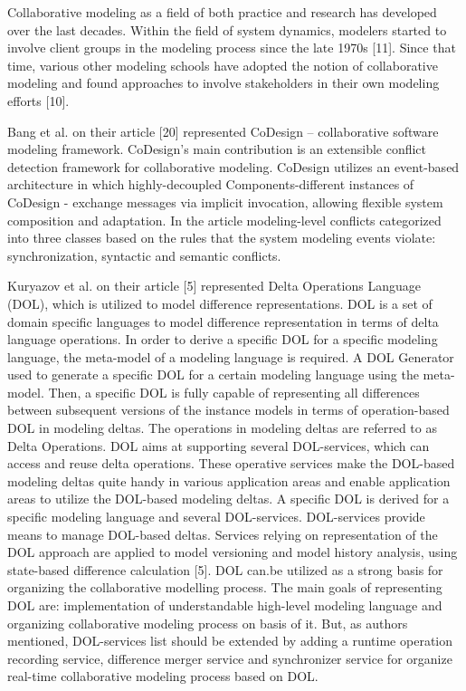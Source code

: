 
Collaborative modeling as a field of both practice and research has developed over the last decades. Within the field of system dynamics, modelers started to involve client groups in the modeling process since the late 1970s [11]. Since that time, various other modeling schools have adopted the notion of collaborative modeling and found approaches to involve stakeholders in their own modeling efforts [10].

	Bang et al. on their article [20] represented CoDesign – collaborative software modeling framework. CoDesign's main contribution is an extensible conflict detection framework for collaborative modeling. CoDesign utilizes an event-based architecture in which highly-decoupled Components-different instances of CoDesign - exchange messages via implicit invocation, allowing flexible system composition and adaptation. In the article modeling-level conflicts categorized into three classes based on the rules that the system modeling events violate: synchronization, syntactic and semantic conflicts. 

Kuryazov et al. on their article [5] represented Delta Operations Language (DOL), which is utilized to model difference representations. DOL is a set of domain specific languages to model difference representation in terms of delta language operations. In order to derive a specific DOL for a specific modeling language, the meta-model of a modeling language is required. A DOL Generator used to generate a specific DOL for a certain modeling language using the meta-model. Then, a specific DOL is fully capable of representing all differences between subsequent versions of the instance models in terms of operation-based DOL in modeling deltas. The operations in modeling deltas are referred to as Delta Operations. DOL aims at supporting several DOL-services, which can access and reuse delta operations. These operative services make the DOL-based modeling deltas quite handy in various application areas and enable application areas to utilize the DOL-based modeling deltas. A specific DOL is derived for a specific modeling language and several DOL-services. DOL-services provide means to manage DOL-based deltas. Services relying on representation of the DOL approach are applied to model versioning and model history analysis, using state-based difference calculation [5]. DOL can.be utilized as a strong basis for organizing the collaborative modelling process. The main goals of representing DOL are: implementation of understandable high-level modeling language and organizing collaborative modeling process on basis of it. But, as authors mentioned, DOL-services list should be extended by adding a runtime operation recording service, difference merger service and synchronizer service for organize real-time collaborative modeling process based on DOL.
